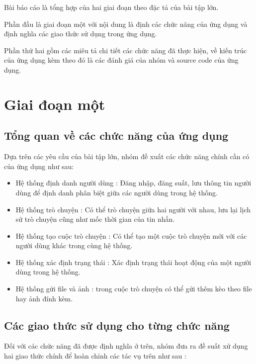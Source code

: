 \documentclass[a4paper]{article}
\begin{document}

\newpage
\tableofcontents
\listoffigures
\newpage
Bài báo cáo là tổng hợp của hai giai đoạn theo đặc tả của bài tập lớn.

Phần đầu là giai đoạn một với nội dung là định các chức năng của ứng dụng và định nghĩa các giao thức sử dụng trong ứng dụng.

Phần thứ hai gồm các miêu tả chi tiết các chức năng đã thực hiện, về kiến trúc của ứng dụng kèm theo đó là các đánh giá của nhóm và source code của ứng dụng.

\section{Giai đoạn một}\label{giai_doan_1}
	\subsection{Tổng quan về các chức năng của ứng dụng}
	Dựa trên các yêu cầu của bài tập lớn, nhóm đề xuất các chức năng chính cần có của ứng dụng như sau:
		\begin{itemize}
			\item Hệ thống định danh người dùng : Đăng nhập, đăng suất, lưu thông tin người dùng để định danh phân biệt giữa các người dùng trong hệ thống.
			\item Hệ thống trò chuyện : Có thể trò chuyện giữa hai người với nhau, lưu lại lịch sử trò chuyện cũng như mốc thời gian của tin nhắn.
			\item Hệ thống tạo cuộc trò chuyện : Có thể tạo một cuộc trò chuyện mới với các người dùng khác trong cùng hệ thống.
			\item Hệ thống xác định trạng thái : Xác định trạng thái hoạt động của một người dùng trong hệ thống.
			\item Hệ thống gửi file và ảnh : trong cuộc trò chuyện có thể gửi thêm kèo theo file hay ảnh đính kèm.
		\end{itemize}
	\subsection{Các giao thức sử dụng cho từng chức năng}
	Đối với các chức năng đã được định nghĩa ở trên, nhóm đưa ra đề suất xử dụng hai giao thức chính để hoàn chỉnh các tác vụ trên như sau : 
\end{document}
